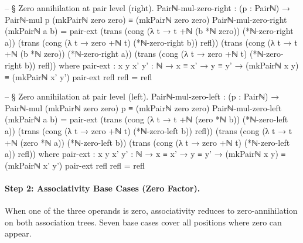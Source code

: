 \documentclass[11pt,a4paper]{book}
\begin{document}
\begin{code}
-- § Zero annihilation at pair level (right).
Pairℕ-mul-zero-right : (p : Pairℕ) → Pairℕ-mul p (mkPairℕ zero zero) ≡ (mkPairℕ zero zero)
Pairℕ-mul-zero-right (mkPairℕ a b) =
  pair-ext
    (trans
      (cong (λ t → t +ℕ (b *ℕ zero)) (*ℕ-zero-right a))
      (trans
        (cong (λ t → zero +ℕ t) (*ℕ-zero-right b))
        refl))
    (trans
      (cong (λ t → t +ℕ (b *ℕ zero)) (*ℕ-zero-right a))
      (trans
        (cong (λ t → zero +ℕ t) (*ℕ-zero-right b))
        refl))
  where
    pair-ext : {x y x' y' : ℕ} → x ≡ x' → y ≡ y' → (mkPairℕ x y) ≡ (mkPairℕ x' y')
    pair-ext refl refl = refl

-- § Zero annihilation at pair level (left).
Pairℕ-mul-zero-left : (p : Pairℕ) → Pairℕ-mul (mkPairℕ zero zero) p ≡ (mkPairℕ zero zero)
Pairℕ-mul-zero-left (mkPairℕ a b) =
  pair-ext
    (trans
      (cong (λ t → t +ℕ (zero *ℕ b)) (*ℕ-zero-left a))
      (trans
        (cong (λ t → zero +ℕ t) (*ℕ-zero-left b))
        refl))
    (trans
      (cong (λ t → t +ℕ (zero *ℕ a)) (*ℕ-zero-left b))
      (trans
        (cong (λ t → zero +ℕ t) (*ℕ-zero-left a))
        refl))
  where
    pair-ext : {x y x' y' : ℕ} → x ≡ x' → y ≡ y' → (mkPairℕ x y) ≡ (mkPairℕ x' y')
    pair-ext refl refl = refl
\end{code}

\paragraph{Step 2: Associativity Base Cases (Zero Factor).}
When one of the three operands is zero, associativity reduces to
zero-annihilation on both association trees. Seven base cases cover
all positions where zero can appear.
\end{document}
